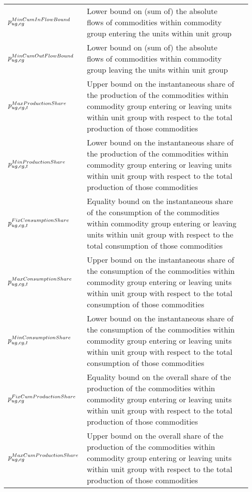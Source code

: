 \begin{longtable}{p{\cola} p{\colc} >{\small\raggedleft\arraybackslash\itshape}p{\colb}}
		$p^{MinCumInFlowBound}_{ug,cg}$	& Lower bound on (sum of) the absolute flows of commodities within commodity group \commoditygroup entering the units within unit group \unitgroup 	&                \\
		$p^{MinCumOutFlowBound}_{ug,cg}$	& Lower bound on (sum of) the absolute flows of commodities within commodity group \commoditygroup leaving the units within unit group \unitgroup 	&                \\
		$p^{MaxProductionShare}_{ug,cg,t}$	& Upper bound on the instantaneous share of the production of the commodities within commodity group \commoditygroup entering or leaving units within unit group \unitgroup with respect to the total production of those commodities	&                \\
		$p^{MinProductionShare}_{ug,cg,t}$	& Lower bound on the instantaneous share of the production of the commodities within commodity group \commoditygroup entering or leaving units within unit group \unitgroup with respect to the total production of those commodities	&                \\
		$p^{FixConsumptionShare}_{ug,cg,t}$	& Equality bound on the instantaneous share of the consumption of the commodities within commodity group \commoditygroup entering or leaving units within unit group \unitgroup with respect to the total consumption of those commodities	&                \\
		$p^{MaxConsumptionShare}_{ug,cg,t}$	& Upper bound on the instantaneous share of the consumption of the commodities within commodity group \commoditygroup entering or leaving units within unit group \unitgroup with respect to the total consumption of those commodities	&                \\
		$p^{MinConsumptionShare}_{ug,cg,t}$	& Lower bound on the instantaneous share of the consumption of the commodities within commodity group \commoditygroup entering or leaving units within unit group \unitgroup with respect to the total consumption of those commodities	&                \\
		$p^{FixCumProductionShare}_{ug,cg}$	& Equality bound on the overall share of the production of the commodities within commodity group \commoditygroup entering or leaving units within unit group \unitgroup with respect to the total production of those commodities	&                \\
		$p^{MaxCumProductionShare}_{ug,cg}$	& Upper bound on the overall share of the production of the commodities within commodity group \commoditygroup entering or leaving units within unit group \unitgroup with respect to the total production of those commodities	&                \\

\end{longtable}

